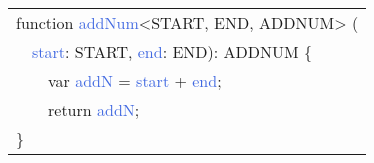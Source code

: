 \scriptsize\begin{tabular}[t]{>{\ttfamily}l}
\textcolor{myrose}{function} \textcolor{RoyalBlue}{addNum}<\textcolor{mygreen}{START}, \textcolor{mygreen}{END}, \textcolor{mygreen}{ADDNUM}> ( \\
\ \ \textcolor{RoyalBlue}{start}: \textcolor{mygreen}{START}, \textcolor{RoyalBlue}{end}: \textcolor{mygreen}{END}): \textcolor{mygreen}{ADDNUM} \{ \\
\ \ \ \ \textcolor{myrose}{var} \textcolor{RoyalBlue}{addN} = \textcolor{RoyalBlue}{start} + \textcolor{RoyalBlue}{end};\\
\ \ \ \ \textcolor{myrose}{return} \textcolor{RoyalBlue}{addN};\\
\}
\end{tabular}